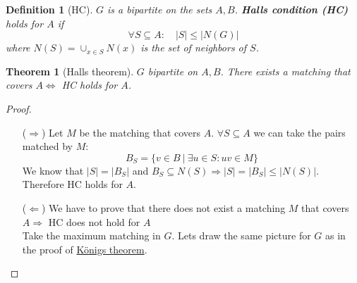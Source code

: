 \documentclass[notitlepage, 12pt]{article}
\newtheorem*{definition}{Definition}
\newtheorem*{theorem}{Theorem}
\begin{document}
\begin{definition}[HC]
  $G$ is a bipartite on the sets $A,B$. \textbf{Halls condition (HC)} holds for $A$ if 
  \[\forall S \subseteq A:\quad |S| \leq |N(G)|\]
  where $N(S) = \cup_{x\in S} N(x)$ is the set of neighbors of $S$.
\end{definition}
\begin{theorem}[Halls theorem]
  $G$ bipartite on $A,B$. There exists a matching that covers $A \iff$ HC holds for $A$.
\end{theorem}
\begin{proof}\hfill

  \begin{itemize}
    \item[($\Rightarrow$)] Let $M$ be the matching that covers $A$. $\forall S \subseteq A$ we can take
    the pairs matched by $M$:
    \[ B_S = \{ v\in B\ |\ \exists u\in S: uv\in M\} \]
    We know that $|S| = |B_S|$ and $B_S \subseteq N(S) \Rightarrow |S| = |B_S| \leq |N(S)|$. Therefore HC holds for $A$.
    \item[($\Leftarrow$)] We have to prove that there does not exist a matching $M$ that covers $A \Rightarrow$ HC does not hold for $A$ \\ Take the maximum matching in $G$. Lets draw the same picture for $G$ as in the proof of \hyperref[konigs-theorem]{Königs theorem}.
    \begin{center}
\end{center}
\end{itemize}
\end{proof}
\end{document}
